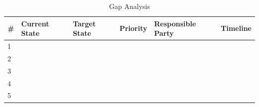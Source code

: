 \begin{table}[H]

\centering

\caption{Gap Analysis}

\label{tab:gap}

\begin{tabularx}{\textwidth}{
l
X
X
c
X
X
}

\toprule

\# &
Current State &
Target State &
Priority &
Responsible Party &
Timeline \\

\midrule

1 &&&&&\\

2 &&&&&\\

3 &&&&&\\

4 &&&&&\\

5 &&&&&\\

\bottomrule

\end{tabularx}

\end{table}
